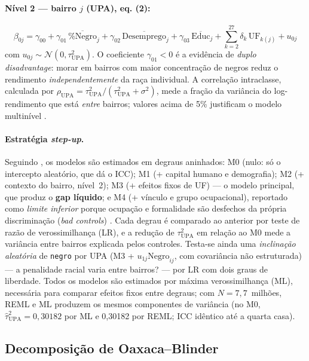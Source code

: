 \documentclass[12pt, a4paper, oneside]{article}
\let\oldsubsectionFB\subsection
\renewcommand{\subsection}{\FloatBarrier\oldsubsectionFB}
\begin{document}
\paragraph{Nível 2 --- bairro $j$ (UPA), eq. (2):}
\begin{equation}
  \beta_{0j} = \gamma_{00} + \gamma_{01}\,\overline{\%\text{Negro}}_{j}
  + \gamma_{02}\,\overline{\text{Desemprego}}_{j} + \gamma_{03}\,\overline{\text{Educ}}_{j}
  + \sum_{k=2}^{27}\delta_k\,\text{UF}_{k(j)} + u_{0j}
  \label{eq:nivel2}
\end{equation}
com $u_{0j}\sim\mathcal{N}(0,\tau^2_{\text{UPA}})$.
O coeficiente $\gamma_{01}<0$ é a evidência de \textit{duplo disadvantage}: morar em
bairros com maior concentração de negros reduz o rendimento \emph{independentemente}
da raça individual. A correlação intraclasse, calculada por
$\rho_{\text{UPA}} = \tau^2_{\text{UPA}}/(\tau^2_{\text{UPA}} + \sigma^2)$,
mede a fração da variância do log-rendimento que está \emph{entre} bairros; valores
acima de 5\% justificam o modelo multinível \cite{raudenbush2002}.

\paragraph{Estratégia \emph{step-up}.} Seguindo , os modelos
são estimados em degraus aninhados: M0 (nulo: só o intercepto aleatório, que dá o ICC);
M1 (+ capital humano e demografia); M2 (+ contexto do bairro, nível~2); M3 (+ efeitos
fixos de UF) --- o modelo principal, que produz o \textbf{gap líquido}; e M4 (+ vínculo
e grupo ocupacional), reportado como \emph{limite inferior} porque ocupação e formalidade
são desfechos da própria discriminação (\emph{bad controls}) \cite{angrist2009}.
Cada degrau é comparado ao anterior por teste de razão de verossimilhança (LR), e a
redução de $\tau^2_{\text{UPA}}$ em relação ao M0 mede a variância entre bairros explicada
pelos controles. Testa-se ainda uma \emph{inclinação aleatória} de \texttt{negro} por UPA
(M3 + $u_{1j}\text{Negro}_{ij}$, com covariância não estruturada) --- a penalidade racial
varia entre bairros? --- por LR com dois graus de liberdade. Todos os modelos são
estimados por máxima verossimilhança (ML), necessária para comparar efeitos fixos entre
degraus; com $N=7{,}7$~milhões, REML e ML produzem os mesmos componentes de variância
(no M0, $\hat\tau^2_{\text{UPA}} = 0,30182$ por ML e 0,30182 por REML;
ICC idêntico até a quarta casa).

\subsection{Decomposição de Oaxaca--Blinder}
\label{subsec:oaxaca_metodo}
\end{document}
